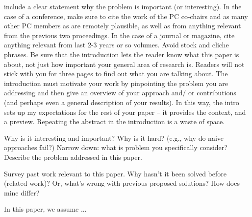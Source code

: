 include a clear statement why the problem is important (or interesting). In
the case of a conference, make sure to cite the work of the PC co-chairs and
as many other PC members as are remotely plausible, as well as from anything
relevant from the previous two proceedings. In the case of a journal or
magazine, cite anything relevant from last 2-3 years or so volumes. Avoid
stock and cliche phrases. Be sure that the introduction lets
the reader know what this paper is about, not just how important your general
area of research is. Readers will not stick with you for three pages to find out
what you are talking about.
The introduction must motivate your work by pinpointing the problem you are
addressing and then give an overview of your approach and/ or contributions
(and perhaps even a general description of your results). In this way, the
intro sets up my expectations for the rest of your paper -- it provides the
context, and a preview. Repeating the abstract in the introduction is a waste
of space.

Why is it interesting and important? Why is it hard? (e.g., why do
naive approaches fail?) Narrow down: what is problem you specifically
consider? Describe the problem addressed in this paper.

Survey past work relevant to this paper. Why hasn't it been solved
before (related work)? Or, what's wrong with previous proposed solutions? How
does mine differ?

In this paper, we assume ...

